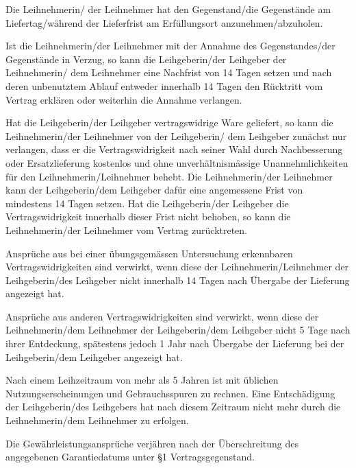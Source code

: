 \documentclass[article, 11pt,a4paper, titlepage, parskip=half, bibliography=totocnumbered]{scrreprt}
\begin{document}
\begin{contract}
		
		Die Leihnehmerin/ der Leihnehmer hat den Gegenstand/die Gegenstände am Liefertag/während der Lieferfrist am Erfüllungsort anzunehmen/abzuholen.
		
		Ist die Leihnehmerin/der Leihnehmer mit der Annahme des Gegenstandes/der Gegenstände in Verzug, so kann die Leihgeberin/der Leihgeber der Leihnehmerin/ dem Leihnehmer eine Nachfrist von 14 Tagen setzen und nach deren unbenutztem Ablauf entweder innerhalb 14 Tagen den Rücktritt vom Vertrag erklären oder weiterhin die Annahme verlangen.
		
		
		
		Hat die Leihgeberin/der Leihgeber vertragswidrige Ware geliefert, so kann die Leihnehmerin/der Leihnehmer von der Leihgeberin/ dem Leihgeber zunächst nur verlangen, dass er die Vertragswidrigkeit nach seiner Wahl durch Nachbesserung oder Ersatzlieferung kostenlos und ohne unverhältnismässige Unannehmlichkeiten für den Leihnehmerin/Leihnehmer behebt. Die Leihnehmerin/der Leihnehmer kann der Leihgeberin/dem Leihgeber dafür eine angemessene Frist von mindestens 14 Tagen setzen. Hat die Leihgeberin/der Leihgeber die Vertragswidrigkeit innerhalb dieser Frist nicht behoben, so kann die Leihnehmerin/der Leihnehmer vom Vertrag zurücktreten.
		
		
		
		Ansprüche aus bei einer übungsgemässen Untersuchung erkennbaren Vertragswidrigkeiten sind verwirkt, wenn diese der Leihnehmerin/Leihnehmer der Leihgeberin/des Leihgeber nicht innerhalb 14 Tagen nach Übergabe der Lieferung angezeigt hat.
		
		Ansprüche aus anderen Vertragswidrigkeiten sind verwirkt, wenn diese der Leihnehmerin/dem Leihnehmer der Leihgeberin/dem Leihgeber nicht 5 Tage nach ihrer Entdeckung, spätestens jedoch 1 Jahr nach Übergabe der Lieferung bei der Leihgeberin/dem Leihgeber angezeigt hat.
		
		Nach einem Leihzeitraum von mehr als 5 Jahren ist mit üblichen Nutzungserscheinungen und Gebrauchsspuren zu rechnen. Eine Entschädigung der Leihgeberin/des Leihgebers hat nach diesem Zeitraum nicht mehr durch die Leihnehmerin/dem Leihnehmer zu erfolgen.
		
				
		
		Die Gewährleistungsansprüche verjähren nach der Überschreitung des angegebenen Garantiedatums unter §1 Vertragsgegenstand.
				

\end{contract}
\end{document}
